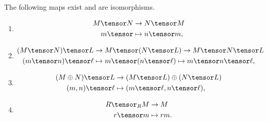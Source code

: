 The following maps exist and are isomorphisms.
\begin{enumerate}[label=(\roman*)]
	\item
		\begin{align*}
			M\tensor N&\to N\tensor M\\
			m\tensor &\mapsto n\tensor m,
		\end{align*}
	\item
		\begin{align*}
			(M\tensor N)\tensor L &\to M\tensor (N\tensor L)\to M\tensor N\tensor L\\
			(m\tensor n)\tensor \ell&\mapsto m\tensor (n\tensor\ell) \mapsto m\tensor n\tensor\ell,
		\end{align*}
	\item
		\begin{align*}
			(M\oplus N)\tensor L &\to (M\tensor L)\oplus (N\tensor L)\\
			(m, n)\tensor \ell&\mapsto (m\tensor\ell, n\tensor\ell),
		\end{align*}
	\item
		\begin{align*}
			R\tensor_R M&\to M\\
			r\tensor m&\mapsto rm.
		\end{align*}
\end{enumerate}
